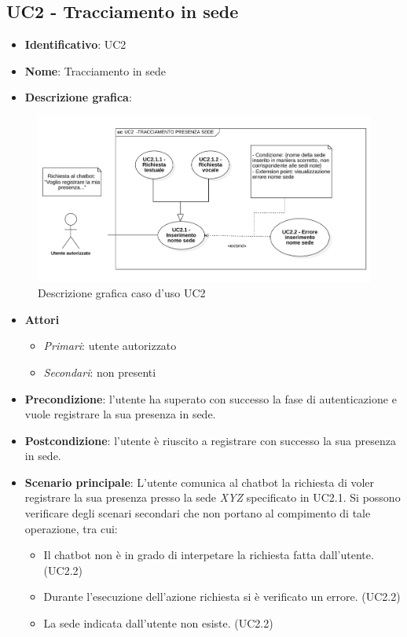 \subsection{UC2 - Tracciamento  in sede}
\begin{itemize}
    \item \textbf{Identificativo}: UC2
    \item \textbf{Nome}: Tracciamento  in sede
    \item \textbf{Descrizione grafica}:
\end{itemize}

\begin{figure}[h]
    \centering
    \includegraphics[scale=0.50]{images/UC2.png} 
    \caption{Descrizione grafica caso d'uso UC2}
\end{figure}

\begin{itemize}
    \item \textbf{Attori}
 \begin{itemize} 
    \item \textit{Primari}: utente autorizzato
    \item \textit{Secondari}: non presenti
 \end{itemize}
 \item \textbf{Precondizione}: l'utente ha superato con successo la fase di autenticazione e vuole registrare la sua presenza in sede. 
 \item \textbf{Postcondizione}: l'utente è riuscito a registrare con successo la sua presenza in sede. 
 \item \textbf{Scenario principale}: L'utente comunica al chatbot la richiesta di voler registrare la sua presenza presso la sede \textit{XYZ} specificato in UC2.1. Si possono verificare degli scenari secondari che non portano al compimento di tale operazione, tra cui:
    \begin{itemize}
        \item Il chatbot non è in grado di interpetare la richiesta fatta dall'utente. (UC2.2)
        \item Durante l'esecuzione dell'azione richiesta si è verificato un errore. (UC2.2)
        \item La sede indicata dall'utente non esiste. (UC2.2)
    \end{itemize}
\end{itemize}
\newpage

